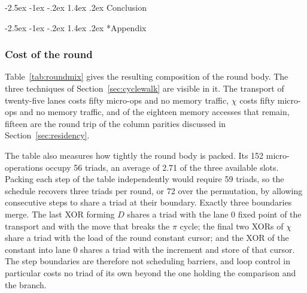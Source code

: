 \documentclass[journal=tches,submission]{iacrtrans}
\makeatletter
\renewcommand\section{\@startsection{section}{1}{\z@}%
      {-2.5ex \@plus -1ex \@minus -.2ex}%
      {1.4ex \@plus .2ex}%
      {\normalfont\Large\bfseries\SS@sectfont}}
\makeatother
\begin{document}
\section{Conclusion}

\section*{Appendix}

\subsubsection{Cost of the round}

Table~\ref{tab:roundmix} gives the resulting composition of the round body. The
three techniques of Section~\ref{sec:cyclewalk} are
visible in it. The transport of twenty-five lanes costs fifty micro-ops and no
memory traffic, $\chi$ costs fifty micro-ops and no memory traffic, and of the
eighteen memory accesses that remain, fifteen are the round trip of the column
parities discussed in Section~\ref{sec:residency}.

The table also measures how tightly the round body is packed. Its 152
micro-operations occupy 56 triads, an average of 2.71 of the three available
slots. Packing each step of the table independently would require 59 triads, so
the schedule recovers three triads per round, or 72 over the permutation, by
allowing consecutive steps to share a triad at their boundary. Exactly three
boundaries merge. The last XOR forming $D$ shares a triad with the lane 0 fixed
point of the transport and with the move that breaks the $\pi$ cycle; the final
two XORs of $\chi$ share a triad with the load of the round constant cursor; and
the XOR of the constant into lane 0 shares a triad with the increment and store
of that cursor. The step boundaries are therefore not scheduling barriers, and
loop control in particular costs no triad of its own beyond the one holding the
comparison and the branch.
\end{document}
